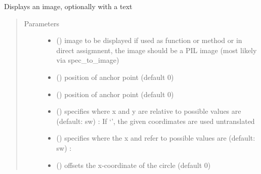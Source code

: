 \documentclass[letterpaper,10pt,english]{sphinxmanual}
\begin{document}

\begin{fulllineitems}
\label{\detokenize{Reference:salabim.AnimateImage}}
Displays an image, optionally with a text
\begin{quote}\begin{description}
\item[{Parameters}] \leavevmode\begin{itemize}
\item {} 
 () \textendash{} image to be displayed 
if used as function or method or in direct assigmnent,
the image should be a PIL image (most likely via spec\_to\_image)

\item {} 
 () \textendash{} position of anchor point (default 0)

\item {} 
 () \textendash{} position of anchor point (default 0)

\item {} 
 () \textendash{} specifies where x and y are relative to 
possible values are (default: sw) : 
If ‘’, the given coordimates are used untranslated

\item {} 
 () \textendash{} specifies where the x and refer to 
possible values are (default: sw) : 

\item {} 
 () \textendash{} offsets the x-coordinate of the circle (default 0)


\end{itemize}
\end{description}
\end{quote}
\end{fulllineitems}
\end{document}
